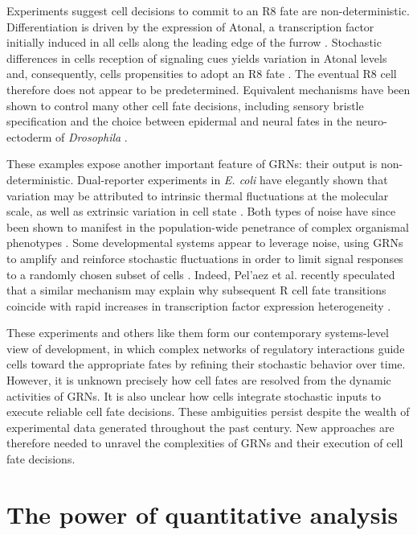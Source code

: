 Experiments suggest cell decisions to commit to an R8 fate are non-deterministic. Differentiation is driven by the expression of Atonal, a transcription factor initially induced in all cells along the leading edge of the furrow \cite{Jarman1994,Baker1997,Hsiung2002}. Stochastic differences in cells reception of signaling cues yields variation in Atonal levels and, consequently, cells propensities to adopt an R8 fate \cite{Baker1990,Gavish2016}. The eventual R8 cell therefore does not appear to be predetermined. Equivalent mechanisms have been shown to control many other cell fate decisions, including sensory bristle specification and the choice between epidermal and neural fates in the neuro-ectoderm of \textit{Drosophila} \cite{Ghysen1993,Simpson1997}.

These examples expose another important feature of GRNs: their output is non-deterministic. Dual-reporter experiments in \emph{E. coli} have elegantly shown that variation may be attributed to intrinsic thermal fluctuations at the molecular scale, as well as extrinsic variation in cell state \cite{Elowitz2002}. Both types of noise have since been shown to manifest in the population-wide penetrance of complex organismal phenotypes \cite{Raj2010,Paulsen2011,Burga2011,Colman-Lerner2005}. Some developmental systems appear to leverage noise, using GRNs to amplify and reinforce stochastic fluctuations in order to limit signal responses to a randomly chosen subset of cells \cite{Baker1990,Ghysen1993,Simpson1997}. Indeed, Pel'{a}ez et al. recently speculated that a similar mechanism may explain why subsequent R cell fate transitions coincide with rapid increases in transcription factor expression heterogeneity \cite{Pelaez2015a}.

These experiments and others like them form our contemporary systems-level view of development, in which complex networks of regulatory interactions guide cells toward the appropriate fates by refining their stochastic behavior over time. However, it is unknown precisely how cell fates are resolved from the dynamic activities of GRNs. It is also unclear how cells integrate stochastic inputs to execute reliable cell fate decisions. These ambiguities persist despite the wealth of experimental data generated throughout the past century. New approaches are therefore needed to unravel the complexities of GRNs and their execution of cell fate decisions.

\section{The power of quantitative analysis}

